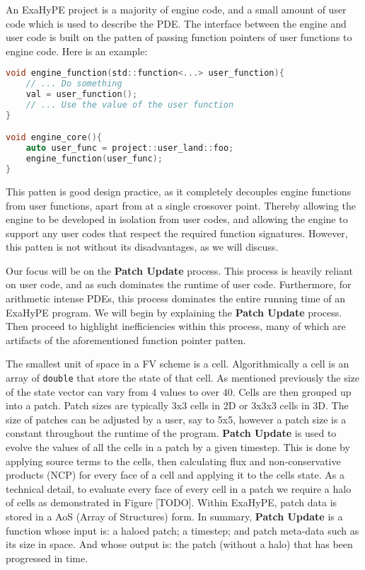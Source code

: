 \newcommand{\proc}[1]{\textbf{#1}}

An ExaHyPE project is a majority of engine code, and a small amount of user code which is used to describe the PDE.
The interface between the engine and user code is built on the patten of passing function pointers of user functions to engine code.
Here is an example:
\begin{lstlisting}[language=c]
void engine_function(std::function<...> user_function){
    // ... Do something
    val = user_function();
    // ... Use the value of the user function 
}

void engine_core(){
    auto user_func = project::user_land::foo;
    engine_function(user_func);
}
\end{lstlisting}

This patten is good design practice, as it completely decouples engine functions from user functions, apart from at a single crossover point.
Thereby allowing the engine to be developed in isolation from user codes, and allowing the engine to support any user codes that respect the required function signatures.
However, this patten is not without its disadvantages, as we will discuss.

Our focus will be on the \proc{Patch Update} process.
This process is heavily reliant on user code, and as such dominates the runtime of user code.
Furthermore, for arithmetic intense PDEs, this process dominates the entire running time of an ExaHyPE program.
We will begin by explaining the \proc{Patch Update} process.
Then proceed to highlight inefficiencies within this process, many of which are artifacts of the aforementioned function pointer patten. 

The smallest unit of space in a FV scheme is a cell.
Algorithmically a cell is an array of \lstinline{double} that store the state of that cell.
As mentioned previously the size of the state vector can vary from $4$ values to over $40$.
Cells are then grouped up into a patch.
Patch sizes are typically 3x3 cells in 2D or 3x3x3 cells in 3D.
The size of patches can be adjusted by a user, say to 5x5, however a patch size is a constant throughout the runtime of the program.
\proc{Patch Update} is used to evolve the values of all the cells in a patch by a given timestep.
This is done by applying source terms to the cells, then calculating flux and non-conservative products (NCP) for every face of a cell and applying it to the cells state.
As a technical detail, to evaluate every face of every cell in a patch we require a halo of cells as demonstrated in Figure [TODO].
Within ExaHyPE, patch data is stored in a AoS (Array of Structures) form.
In summary, \proc{Patch Update} is a function whose input is: a haloed patch; a timestep; and patch meta-data such as its size in space. And whose output is: the patch (without a halo) that has been progressed in time. 

